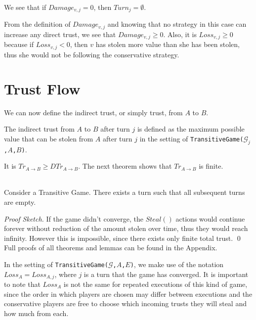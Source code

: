 \documentclass[11pt]{llncs}
\theoremstyle{definition}
\newenvironment{proofsketch}{\textit{Proof Sketch.}}{\qed \smallskip \ \\}
\begin{document}
     We see that if $Damage_{v, j} = 0$, then $Turn_j = \emptyset$.

     From the definition of $Damage_{v,j}$ and knowing that no strategy in this case can increase any direct trust, we see
     that $Damage_{v,j} \geq 0$. Also, it is $Loss_{v,j} \geq 0$ because if $Loss_{v,j} < 0$, then $v$ has
     stolen more value than she has been stolen, thus she would not be following the conservative strategy.
  \section{Trust Flow}
    We can now define the indirect trust, or simply trust, from $A$ to $B$.
    \begin{definition}
       The indirect trust from $A$ to $B$ after turn $j$ is defined as the maximum possible value that can be stolen from
       $A$ after turn $j$ in the setting of \texttt{TransitiveGame(}$\mathcal{G}_j$\texttt{,}$A$\texttt{,}$B$\texttt{)}.
    \end{definition}
    \noindent It is $Tr_{A \rightarrow B} \geq DTr_{A \rightarrow B}$. The next theorem shows that
    $Tr_{A \rightarrow B}$ is finite.
    \begin{theorem} \ \\
       \label{convergence}
       Consider a Transitive Game. There exists a turn such that all subsequent turns are empty.
    \end{theorem}
    \begin{proofsketch}
       If the game didn't converge, the $Steal\left(\right)$ actions would continue forever without reduction of the amount
       stolen over time, thus they would reach infinity. However this is impossible, since there exists only finite total
       trust.
    \end{proofsketch}
    Full proofs of all theorems and lemmas can be found in the Appendix.

    In the setting of \texttt{TransitiveGame(}$\mathcal{G}$\texttt{,}$A$\texttt{,}$E$\texttt{)}, we make use of the notation
    $Loss_A = Loss_{A, j}$, where $j$ is a turn that the game has converged. It is important to note that $Loss_A$ is
    not the same for repeated executions of this kind of game, since the order in which players are chosen may differ between
    executions and the conservative players are free to choose which incoming trusts they will steal and how much from each.
\end{document}
